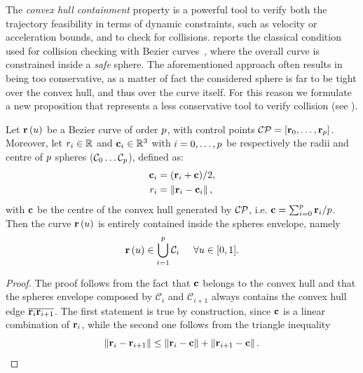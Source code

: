 The \emph{convex hull containment} property is a powerful tool to verify both the trajectory feasibility in terms of dynamic constraints,
such as velocity or acceleration bounds, and to check for collisions.  reports the classical
condition used for collision checking with B\acuteacc ezier curves~\cite{tang2020real}, where the overall curve is constrained inside a
\emph{safe} sphere. The aforementioned approach often results in being too conservative, as a matter of fact the considered sphere
is far to be tight over the convex hull, and thus over the curve itself. For this reason we formulate a new proposition that represents
a less conservative tool to verify collision (see ).
\begin{proposition}%
	\label{PROPOSITION:EXPLORATION-ENVELOPE-CONTAINMENT}
	Let $\mathbf{r} \left( u \right)$ be a B\acuteacc ezier curve of order $p$, with control points $\mathcal{CP}= \left[ \mathbf{r}_0, \dots, \mathbf{r}_{p} \right]$.
	Moreover, let $r_i \in \mathbb{R}$  and $\mathbf{c}_i \in \mathbb{R}^3$ with $i=0, \dots, p$ be respectively the radii and centre of $p$ spheres
	($\mathcal{C}_0 \dots \mathcal{C}_{p}$), defined as:
	\begin{equation*}
		\begin{split}
			\mathbf{c}_i & = (\mathbf{r}_i + \mathbf{c})/2, \\
			r_i & = \left \lVert {\mathbf{r}_i - \mathbf{c}_i} \right \rVert,
		\end{split}
	\end{equation*}
	with $\mathbf{c}$ be the centre of the convex hull generated by $\mathcal{CP}$, i.e. $\mathbf{c} = \sum_{i=0}^{p} \mathbf{r}_i/p$.
	Then the curve $\mathbf{r} \left( u \right)$ is entirely contained inside the spheres envelope, namely
	\begin{equation*}
		\mathbf{r} \left( u \right) \in \bigcup_{i=1}^{p} \mathcal{C}_i \hspace{0.5cm} \forall u \in [0,1].
	\end{equation*}
\end{proposition}
\begin{proof}
    The proof follows from the fact that $\mathbf{c}$ belongs to the convex hull and that the spheres envelope composed by
	$\mathcal{C}_i$ and $\mathcal{C}_{i+1}$ always contains the convex hull edge $\overline{\mathbf{r}_i\mathbf{r}_{i+1}}$.
	The first statement is true by construction, since $\mathbf{c}$ is a linear combination of $\mathbf{r}_i$, while the second one
	follows from the triangle inequality
	\begin{equation*}
		\left \lVert {\mathbf{r}_i - \mathbf{r}_{i+1}} \right \rVert \le \left \lVert {\mathbf{r}_i - \mathbf{c}} \right \rVert + \left \lVert {\mathbf{r}_{i+1} - \mathbf{c}} \right \rVert. \qedhere
	\end{equation*} 
\end{proof}
